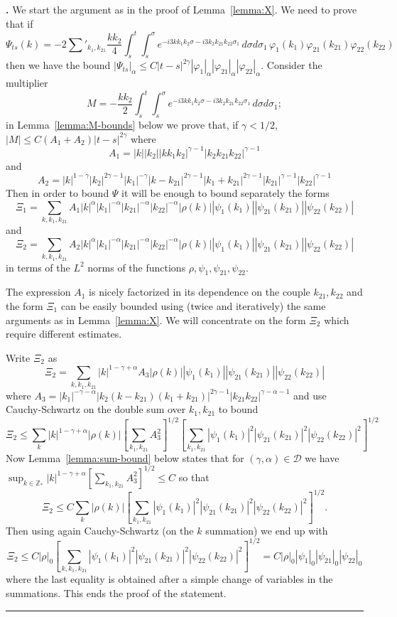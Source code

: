 \documentclass[a4paper,11pt,reqno]{article}
\newcommand{\DD}{\mathcal{D}}
\newcommand{\ZZ}{\mathbb{Z}}
\newenvironment{proof}[1][Proof]{\textbf{#1.} }{\ \rule{0.5em}{0.5em}}
\begin{document}
\begin{proof}[]
We start the argument  as in the proof of Lemma~\ref{lemma:X}.
We need to prove that if
$$
\Psi_{ts}(k) = - 2 \sum'_{k_1,k_{21}}  \frac{k k_2}4  \int_s^t  \int_s^\sigma e^{-i 3
  k k_1 k_2 \sigma
- i 3 k_2 k_{21} k_{22} \sigma_1}
 \, d\sigma   d\sigma_1\,  \varphi_1(k_1)   \varphi_{21}(k_{21})  \varphi_{22}(k_{22})  
$$  
then we have the bound
$|\Psi_{ts}|_{\alpha} \le C |t-s|^{2\gamma} |\varphi_1|_{\alpha}
|\varphi_{21}|_{\alpha} |\varphi_{22}|_{\alpha}$.
 Consider the
multiplier
\begin{equation}
  \label{eq:M-mult}
M = -   \frac{k k_2}2  \int_s^t  \int_s^\sigma e^{-i 3
  k k_1 k_2 \sigma
- i 3 k_2 k_{21} k_{22} \sigma_1} \, d\sigma   d\sigma_1;  
\end{equation}
in Lemma~\ref{lemma:M-bounds} below we prove that, if $\gamma < 1/2$,
$
|M| \le C (A_1+A_2)  |t-s|^{2\gamma} 
$
where 
$$
A_1 = |k| |k_2| |k k_1 k_2|^{\gamma-1} |k_2 k_{21} k_{22}|^{\gamma-1}
$$
and
$$
A_2 = |k|^{1-\gamma} |k_2|^{2\gamma-1} |k_1|^{-\gamma}
|k-k_{21}|^{2\gamma-1} 
|k_1+k_{21}|^{2\gamma-1} |k_{21}|^{\gamma-1} |k_{22}|^{\gamma-1}
$$
Then in order to bound $\Psi$ it will be enough to bound separately
the forms
$$
\Xi_1 = \sum_{k,k_1,k_{21}} A_1 |k|^{\alpha} |k_1|^{-\alpha}
|k_{21}|^{-\alpha} |k_{22}|^{-\alpha} |\rho(k)| |\psi_1(k_1)|   |\psi_{21}(k_{21})|  |\psi_{22}(k_{22})|  
$$
and
$$
\Xi_2 = \sum_{k,k_1,k_{21}} A_2 |k|^{\alpha} |k_1|^{-\alpha}
|k_{21}|^{-\alpha} |k_{22}|^{-\alpha} |\rho(k)| |\psi_1(k_1)|   |\psi_{21}(k_{21})|  |\psi_{22}(k_{22})|  
$$
in terms of the $L^2$ norms of the functions $\rho,\psi_1,\psi_{21},\psi_{22}$.

The expression $A_1$ is nicely factorized in its dependence on the
couple $k_{21},k_{22}$ and  the form $\Xi_1$ can be easily bounded
using (twice and iteratively) the same arguments as in
Lemma~\ref{lemma:X}.
We will concentrate on the form $\Xi_2$ which require  different
estimates. 

Write $\Xi_2$ as
$$
\Xi_2 = \sum_{k,k_1,k_{21}} |k|^{1-\gamma+\alpha} A_3
 |\rho(k)| |\psi_1(k_1)|   |\psi_{21}(k_{21})|  |\psi_{22}(k_{22})|  
$$
where
$
A_3 =    |k_1|^{-\gamma-\alpha}
|k_2(k-k_{21})(k_1+k_{21})|^{2\gamma-1} 
 |k_{21} k_{22}|^{\gamma-\alpha-1}
$
and use Cauchy-Schwartz on the double sum over $k_1,k_{21}$ to bound
$$
\Xi_2 \le \sum_{k} |k|^{1-\gamma+\alpha} 
 |\rho(k)|   
 \left[\sum_{k_1,k_{21}}A_3^2\right]^{1/2}
\left[\sum_{k_1,k_{21}} |\psi_1(k_1)|^2   |\psi_{21}(k_{21})|^2  |\psi_{22}(k_{22})|^2\right]^{1/2}
$$
Now Lemma~\ref{lemma:sum-bound} below states that for $(\gamma,\alpha) \in \DD$ we
have
$
\sup_{k\in\ZZ_*} |k|^{1-\gamma+\alpha} 
 [\sum_{k_1,k_{21}}A_3^2]^{1/2} \le C
$
so that
$$
\Xi_2 \le C \sum_{k}
 |\rho(k)|   
\left[\sum_{k_1,k_{21}} |\psi_1(k_1)|^2   |\psi_{21}(k_{21})|^2  |\psi_{22}(k_{22})|^2\right]^{1/2}.
$$
Then using again  Cauchy-Schwartz (on the $k$ summation) we end up with
$$
\Xi_2 \le C |\rho|_0
\left[\sum_{k,k_1,k_{21}} |\psi_1(k_1)|^2   |\psi_{21}(k_{21})|^2
  |\psi_{22}(k_{22})|^2\right]^{1/2} = C|\rho|_0 |\psi_1|_0
|\psi_{21}|_0 |\psi_{22}|_0
$$
where the last equality is obtained after a simple change of variables
in the summations. This ends the proof of the statement.
\end{proof}
\end{document}
